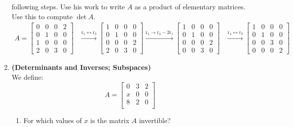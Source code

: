 \documentclass[red]{tutorial}
\newcommand{\row}[1]{\mathrm{r}_{#1}}
\newcommand{\mat}[1]{\begin{bmatrix} #1 %
\end{bmatrix}}
\theoremstyle{definition}
\theoremstyle{theorem}
\begin{document}
\begin{tutorial}
\begin{enumerate}
      following steps. Use his work to write $A$ as a 
      product of elementary matrices. Use this to compute $\det A$.
      \begin{align*}
        A = \begin{bmatrix}
          0 & 0 & 0 & 2 \\
          0 & 1 & 0 & 0 \\
          1 & 0 & 0 & 0 \\
          2 & 0 & 3 & 0
        \end{bmatrix}
        &\xrightarrow{\row{1} \leftrightarrow \row{3}}
        \begin{bmatrix}
          1 & 0 & 0 & 0 \\
          0 & 1 & 0 & 0 \\
          0 & 0 & 0 & 2 \\
          2 & 0 & 3 & 0
        \end{bmatrix}
        \xrightarrow{\row{4} \to \row{4}-2\row{1}}
        \begin{bmatrix}
          1 & 0 & 0 & 0 \\
          0 & 1 & 0 & 0 \\
          0 & 0 & 0 & 2 \\
          0 & 0 & 3 & 0
        \end{bmatrix}
        &\xrightarrow{\row{4} \leftrightarrow \row{3}}
        \begin{bmatrix}
          1 & 0 & 0 & 0 \\
          0 & 1 & 0 & 0 \\
          0 & 0 & 3 & 0 \\
          0 & 0 & 0 & 2
        \end{bmatrix}
      \end{align*}
    \pagebreak %
    \item \label{q:determinants} \textbf{(Determinants and 
      Inverses; Subspaces)}\\
      We define:
      \begin{equation*}
        A =
        \mat{
          0 & 3 & 2 \\
          x & 0 & 0 \\
          8 & 2 & 0 \\
        }
      \end{equation*}
      \begin{enumerate}
        \item For which values of $x$ is the matrix $A$ invertible?

\end{enumerate}
\end{enumerate}
\end{tutorial}
\end{document}
